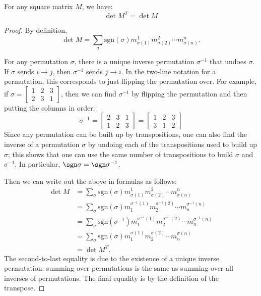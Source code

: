 \begin{theorem}
For any square matrix $M$, we have:
\[
\det M^T = \det M
\]
\end{theorem}
\begin{proof}
  By definition, \[
\det M = \sum_{\sigma} \text{sgn}(\sigma) m^1_{\sigma(1)}m^2_{\sigma(2)}\cdots m^n_{\sigma(n)}.
\]

For any permutation $\sigma$, there is a unique inverse permutation $\sigma^{-1}$ that undoes $\sigma$.  If $\sigma$ sends $i\rightarrow j$, then $\sigma^{-1}$ sends $j\rightarrow i$.  In the two-line notation for a permutation, this corresponds to just flipping the permutation over.  For example, if $\sigma=\begin{bmatrix} 
1 & 2 & 3 \\
2 & 3 & 1
\end{bmatrix}$, then we can find $\sigma^{-1}$ by flipping the permutation and then putting the columns in order:
\[
\sigma^{-1}=\begin{bmatrix} 
2 & 3 & 1 \\
1 & 2 & 3
\end{bmatrix}=\begin{bmatrix} 
1 & 2 & 3 \\
3 & 1 & 2
\end{bmatrix}
\]
Since any permutation can be built up by transpositions, one can also find the inverse of a permutation $\sigma$ by undoing each of the transpositions used to build up $\sigma$; this shows that one can use the same number of transpositions to build $\sigma$ and $\sigma^{-1}$.  In particular, $\sgn \sigma= \sgn \sigma^{-1}$.


Then we can write out the above in formulas as follows:
\begin{align*}
\det M &= \sum_{\sigma} \text{sgn}(\sigma) m^1_{\sigma(1)}m^2_{\sigma(2)}\cdots m^n_{\sigma(n)} \\
&=\sum_{\sigma} \text{sgn}(\sigma) m_1^{\sigma^{-1}(1)}m_2^{\sigma^{-1}(2)}\cdots m_n^{\sigma^{-1}(n)} \\
&=\sum_{\sigma} \text{sgn}(\sigma^{-1}) m_1^{\sigma^{-1}(1)}m_2^{\sigma^{-1}(2)}\cdots m_n^{\sigma^{-1}(n)} \\
&= \sum_{\sigma} \text{sgn}(\sigma) m_1^{\sigma(1)}m_2^{\sigma(2)}\cdots m_n^{\sigma(n)} \\
&= \det M^T.
\end{align*}
The second-to-last equality is due to the existence of a unique inverse permutation: summing over permutations is the same as summing over all inverses of permutations.  The final equality is by the definition of the transpose.
\end{proof}

